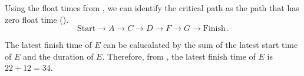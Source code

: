 \begin{subquestions}
\begin{subsubquestions}

\subsubquestion

\begin{subsubsubquestions}

\subsubsubquestion

Using the float times from , we can identify the critical path as the path that has zero float time ().
\begin{equation}
	\text{Start} \rightarrow A \rightarrow C \rightarrow D \rightarrow F \rightarrow G \rightarrow \text{Finish} \,.
\end{equation}	


\subsubsubquestion

The latest finish time of $E$ can be calucalated by the sum of the latest start time of $E$ and the duration of $E$. Therefore, from , the latest finish time of $E$ is $22 + 12 = 34$.

\end{subsubsubquestions}

\end{subsubquestions}

\end{subquestions}

